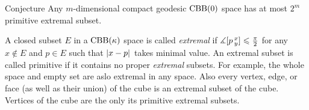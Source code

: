 \begin{thm}{Conjecture}
Any $m$-dimensional compact geodesic $\mathrm{CBB}(0)$ space has at most $2^m$ primitive extremal subset.
\end{thm}

A closed subset $E$ in a $\mathrm{CBB}(\kappa)$ space is called 
\emph{extremal} if $\measuredangle[p\,{}^{x}_{y}]\leqslant \tfrac\pi2$ for any $x\notin E$ and $p\in E$ such that $\dist{x}{p}{}$ takes minimal value.
An extremal subset is called primitive if it contains no proper \emph{extremal} subsets.
For example, the whole space and empty set are aslo extremal in any space.
Also every vertex, edge, or face (as well as their union) of the cube is an extremal subset of the cube.
Vertices of the cube are the only its primitive extremal subsets.

